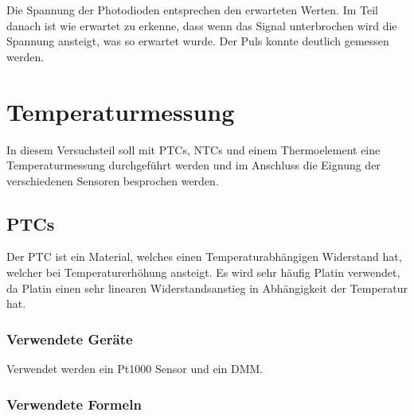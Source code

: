 \documentclass[12pt,a4paper]{article}
\begin{document}
Die Spannung der Photodioden entsprechen den erwarteten Werten. Im Teil danach ist wie erwartet zu erkenne, dass wenn das Signal unterbrochen wird die Spannung ansteigt, was so erwartet wurde. Der Puls konnte deutlich gemessen werden.



\section{Temperaturmessung}

In diesem Versuchsteil soll mit PTCs, NTCs und einem Thermoelement eine Temperaturmessung durchgeführt werden und im Anschluss die Eignung der verschiedenen Sensoren besprochen werden.


\subsection{PTCs}

Der PTC ist ein Material, welches einen Temperaturabhängigen Widerstand hat, welcher bei Temperaturerhöhung ansteigt. Es wird sehr häufig Platin verwendet, da Platin einen sehr linearen Widerstandsanstieg in Abhängigkeit der Temperatur hat.

\subsubsection*{Verwendete Geräte}

Verwendet werden ein Pt1000 Sensor und ein DMM.

\subsubsection*{Verwendete Formeln}
\end{document}
